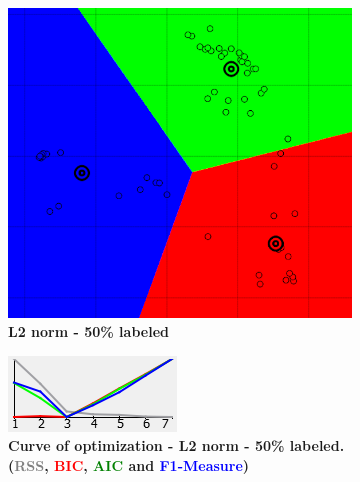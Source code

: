 \begin{figure}[!h]
\centering
	\begin{subfigure}[h]{0.25\textwidth}
    \centering
	\includegraphics[height=0.08\textheight]{./clustering/opt_F1_50__k_mean_L2_range7.png}
	\caption{\bf L2 norm - 50\% labeled}
    \label{fig:figure11a}
	\end{subfigure}
    \hspace{20mm}
	\begin{subfigure}[h]{0.50\textwidth}
    \centering
	\includegraphics[height=0.08\textheight]{./clustering/curve_opt_F1_50__k_mean_L2_range7.png}
	\caption{\bf Curve of optimization - L2 norm - 50\% labeled. (\textcolor{gray}{RSS}, \textcolor{red}{BIC}, \textcolor{green}{AIC} and \textcolor{blue}{F1-Measure})}
    \label{fig:figur11c}
	\end{subfigure}\\ 
    \begin{subfigure}[h]{0.25\textwidth}
    \centering

\end{subfigure}
\end{figure}
